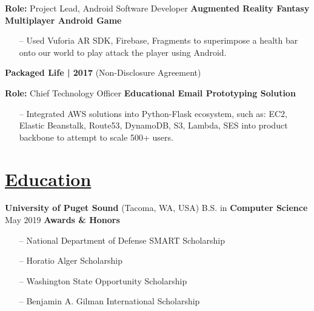 \documentclass{article}
\begin{document}
\begin{multicols}{2}
{\footnotesize{
\newline\textbf{Role:} Project Lead, Android Software Developer
\newline\textbf{Augmented Reality Fantasy Multiplayer Android Game}
\begin{itemize}
	\item[--] Used Vuforia AR SDK, Firebase, Fragments to superimpose a health bar onto our world to play attack the player using Android.
\end{itemize} 
}}
\hfill \break
{\footnotesize{\textbf{Packaged Life | 2017} (Non-Disclosure Agreement)}}
{\footnotesize{
\newline\textbf{Role:} Chief Technology Officer
\newline\textbf{Educational Email Prototyping Solution}
\begin{itemize}
	\item[--] Integrated AWS solutions into Python-Flask ecosystem, such as: EC2, Elastic Beanstalk, Route53, DynamoDB, S3, Lambda, SES into product backbone to attempt to scale 500+ users.
\end{itemize} 
}}
\hfill \break
\section*{\underline{Education}}
{\footnotesize{
\textbf{University of Puget Sound} (Tacoma, WA, USA)
\newline B.S. in \textbf{Computer Science}
\newline May 2019
\newline\newline\textbf{Awards \& Honors}
\begin{itemize}
	\item[--] National Department of Defense SMART Scholarship
	\item[--] Horatio Alger Scholarship
	\item[--] Washington State Opportunity Scholarship
	\item[--] Benjamin A. Gilman International Scholarship   
\end{itemize} 
}}

\hfill  \quad

\end{multicols} 
\end{document}
